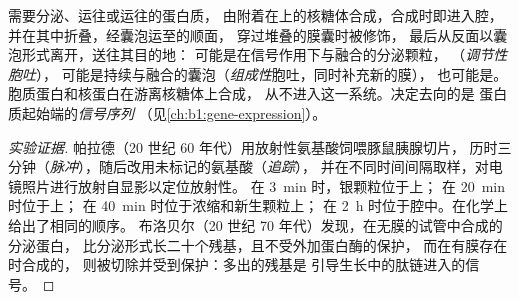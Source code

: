 \begin{proposition}[分泌途径]\label{prop:b1:eukaryotic-cell:secretory}
需要分泌、运往或运往的蛋白质，
由附着在上的核糖体合成，合成时即进入腔，
并在其中折叠，经囊泡运至的顺面，
穿过堆叠的膜囊时被修饰，
最后从反面以囊泡形式离开，送往其目的地：
可能是在信号作用下与融合的分泌颗粒，
（\emph{调节性胞吐}），
可能是持续与融合的囊泡（\emph{组成性}胞吐，同时补充新的膜），
也可能是。胞质蛋白和核蛋白在游离核糖体上合成，
从不进入这一系统。决定去向的是
蛋白质起始端的\emph{信号序列}
（见\cref{ch:b1:gene-expression}）。
\end{proposition}
\begin{proof}[实验证据]
帕拉德（20 世纪 60 年代）用放射性氨基酸饲喂豚鼠胰腺切片，
历时三分钟（\emph{脉冲}），随后改用未标记的氨基酸（\emph{追踪}），
并在不同时间间隔取样，对电镜照片进行放射自显影以定位放射性。
在 \qty{3}{min} 时，银颗粒位于上；
在 \qty{20}{min} 时位于上；
在 \qty{40}{min} 时位于浓缩和新生颗粒上；
在 \qty{2}{h} 时位于腔中。在化学上给出了相同的顺序。
布洛贝尔（20 世纪 70 年代）发现，在无膜的试管中合成的分泌蛋白，
比分泌形式长二十个残基，且不受外加蛋白酶的保护，
而在有膜存在时合成的，
则被切除并受到保护：多出的残基是
引导生长中的肽链进入的信号。
\end{proof}

